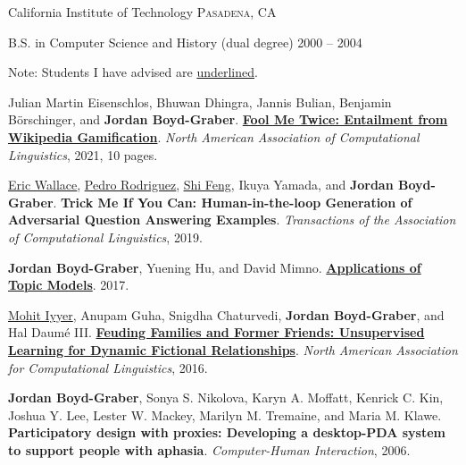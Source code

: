 \documentclass[10pt,a4paper]{article} %
\begin{document}

\headedsection %
{California Institute of Technology}
{\textsc{Pasadena, CA}} {

\headedsubsection %
{B.S. in Computer Science and History (dual degree)}
{2000 -- 2004} {}
}

\spacedhrule{0.5em}{-0.4em} %



\inlineheadsection %
{Note:}
{Students I have advised are \underline{underlined}.}

\small

\begin{enumerate*}
	 \item Julian Martin Eisenschlos, Bhuwan Dhingra, Jannis Bulian, Benjamin B\"orschinger, and {\bf Jordan Boyd-Graber}.  {\bf \href{http://umiacs.umd.edu/~jbg//docs/2021_naacl_fm2.pdf}{Fool Me Twice: Entailment from Wikipedia Gamification}}.  \emph{North American Association of Computational Linguistics}, 2021, 10 pages.

 
\item \underline{\href{http://www.ericswallace.com/}{Eric Wallace}}, \underline{\href{https://www.pedro.ai}{Pedro Rodriguez}}, \underline{\href{http://users.umiacs.umd.edu/~shifeng/}{Shi Feng}}, Ikuya Yamada, and {\bf Jordan Boyd-Graber}.  {\bf Trick Me If You Can: Human-in-the-loop Generation of Adversarial Question Answering Examples}.  \emph{Transactions of the Association of Computational Linguistics}, 2019.

\item {\bf Jordan Boyd-Graber}, Yuening Hu, and David Mimno.  {\bf \href{http://www.nowpublishers.com/article/Details/INR-030}{Applications of Topic Models}}.  2017.

\item \underline{Mohit Iyyer}, Anupam Guha, Snigdha Chaturvedi, {\bf Jordan Boyd-Graber}, and Hal {Daum\'{e} III}.  {\bf \href{http://cs.colorado.edu/~jbg//docs/2016_naacl_relationships.pdf}{Feuding Families and Former Friends: Unsupervised Learning for Dynamic Fictional Relationships}}.  \emph{North American Association for Computational Linguistics}, 2016.

\item {\bf Jordan Boyd-Graber}, Sonya S. Nikolova, Karyn A. Moffatt, Kenrick
C. Kin, Joshua Y. Lee, Lester W. Mackey, Marilyn M. Tremaine, and
Maria M. Klawe.  {\bf Participatory design with proxies: {D}eveloping
  a desktop-{PDA} system to support people with aphasia}.
\emph{Computer-Human Interaction}, 2006.


\end{enumerate*}
\end{document}
